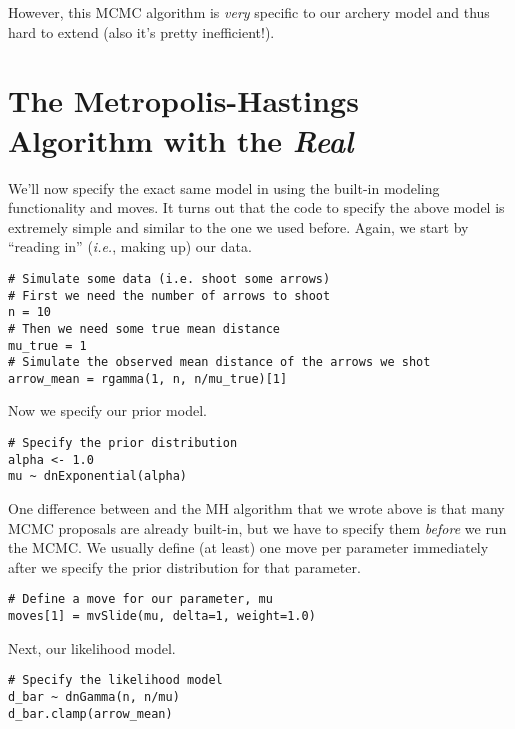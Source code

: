 However, this MCMC algorithm is \emph{very} specific to our archery model and thus hard to extend (also it's pretty inefficient!).


\section{The Metropolis-Hastings Algorithm with the \emph{Real} \RevBayes}
We'll now specify the exact same model in \Rev using the built-in modeling functionality and moves.
It turns out that the \Rev code to specify the above model is extremely simple and similar to the one we used before.
Again, we start by ``reading in'' (\emph{i.e.}, making up) our data.

{\tt \begin{snugshade*}
\begin{lstlisting}    
# Simulate some data (i.e. shoot some arrows)
# First we need the number of arrows to shoot
n = 10
# Then we need some true mean distance
mu_true = 1
# Simulate the observed mean distance of the arrows we shot
arrow_mean = rgamma(1, n, n/mu_true)[1]
\end{lstlisting}
\end{snugshade*}}

Now we specify our prior model.
{\tt \begin{snugshade*}
\begin{lstlisting}    
# Specify the prior distribution
alpha <- 1.0
mu ~ dnExponential(alpha)
\end{lstlisting}
\end{snugshade*}}

One difference between \RevBayes and the MH algorithm that we wrote above is that many MCMC proposals are already built-in, but we have to specify them \emph{before} we run the MCMC.
We usually define (at least) one move per parameter immediately after we specify the prior distribution for that parameter.

{\tt \begin{snugshade*}
\begin{lstlisting}    
# Define a move for our parameter, mu
moves[1] = mvSlide(mu, delta=1, weight=1.0)
\end{lstlisting}
\end{snugshade*}}

Next, our likelihood model.
{\tt \begin{snugshade*}
\begin{lstlisting}    
# Specify the likelihood model
d_bar ~ dnGamma(n, n/mu)
d_bar.clamp(arrow_mean)
\end{lstlisting}
\end{snugshade*}}

